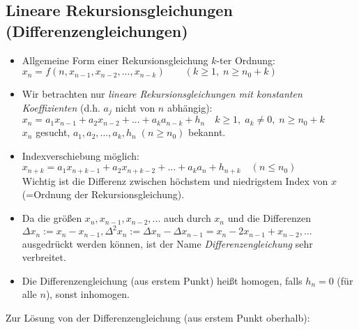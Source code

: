 \subsection{Lineare Rekursionsgleichungen (Differenzengleichungen)}
\begin{itemize}
\item Allgemeine Form einer Rekursionsgleichung $k$-ter Ordnung:\\
$x_n=f(n,x_{n-1},x_{n-2},...,x_{n-k}) \qquad (k \geq 1,\; n\geq n_0+k)$
\item Wir betrachten nur \emph{lineare Rekursionsgleichungen mit konstanten Koeffizienten} (d.h. $a_j$ nicht von $n$ abhängig):\\
$\boxed{x_n=a_1 x_{n-1}+a_2 x_{n-2}+...+a_k a_{n-k}+h_n}\quad k\geq 1, \; a_k \not = 0, \; n\geq n_0 +k$\\
$x_n$ gesucht, $a_1,a_2,...,a_k, h_n \; (n\geq n_0)$ bekannt.
\item Indexverschiebung möglich:\\
$\boxed{x_{n+k}=a_1 x_{n+k-1}+a_2 x_{n+k-2}+...+a_k a_{n}+h_{n+k}}\quad (n\leq n_0)$\\
Wichtig ist die Differenz zwischen höchstem und niedrigstem Index von $x$ (=Ordnung der Rekursionsgleichung).
\item Da die größen $x_n, x_{n-1}, x_{n-2},...$ auch durch $x_n$ und die Differenzen $\Delta x_n:=x_n-x_{n-1}, \Delta^2x_n:=\Delta x_n-\Delta x_{n-1}=x_n-2x_{n-1}+x_{n-2}, ...$ ausgedrückt werden können, ist der Name \emph{Differenzengleichung} sehr verbreitet.
\item Die Differenzengleichung (aus erstem Punkt) heißt homogen, falls $h_n=0$ (für alle $n$), sonst inhomogen.
\end{itemize}
Zur Lösung von der Differenzengleichung (aus erstem Punkt oberhalb):
